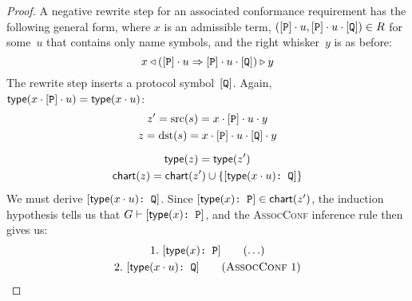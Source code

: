 \documentclass[../generics]{subfiles}
\begin{document}
\begin{proof}
 A negative rewrite step for an associated conformance requirement has the following general form, where $x$ is an admissible term, $([\texttt{P}]\cdot u,[\texttt{P}]\cdot u\cdot [\texttt{Q}])\in R$ for some~$u$ that contains only name symbols, and the right whisker~$y$ is as before:
\[x\triangleleft ([\texttt{P}]\cdot u\Rightarrow[\texttt{P}]\cdot u\cdot[\texttt{Q}])\triangleright y\]
The rewrite step inserts a protocol symbol~$[\texttt{Q}]$. Again, $\mathsf{type}(x\cdot [\texttt{P}] \cdot u)=\mathsf{type}(x\cdot u)$:
\begin{gather*}
z^\prime=\operatorname{src}(s)=x\cdot[\texttt{P}]\cdot u\cdot y\\
z=\operatorname{dst}(s)=x\cdot[\texttt{P}]\cdot u\cdot[\texttt{Q}]\cdot y\\[\medskipamount]
\mathsf{type}(z)=\mathsf{type}(z^\prime)\\
\mathsf{chart}(z)=\mathsf{chart}(z^\prime) \cup \{[\texttt{$\mathsf{type}(x\cdot u)$:~Q}]\}
\end{gather*}
We must derive $[\texttt{$\mathsf{type}(x\cdot u)$:~Q}]$. Since $[\texttt{$\mathsf{type}(x)$:~P}]\in\mathsf{chart}(z^\prime)$, the induction hypothesis tells us that $G\vdash[\texttt{$\mathsf{type}(x)$:~P}]$, and the \textsc{AssocConf} inference rule then gives us:
\begin{gather*}
\AnyStep{\ConfReq{$\Type(x)$}{P}}{1}\\
\AssocConfStep{1}{$\Type(x\cdot u)$}{Q}{2}
\end{gather*}


\end{proof}
\end{document}
